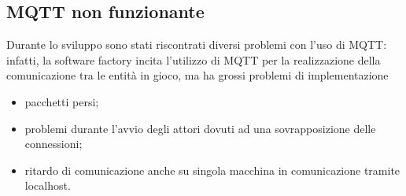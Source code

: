 \subsection{MQTT non funzionante}
Durante lo sviluppo sono stati riscontrati diversi problemi con l'uso di MQTT\@:
infatti, la software factory incita l'utilizzo di MQTT per la realizzazione della comunicazione tra le entità in gioco, ma ha grossi problemi di implementazione
\begin{itemize}
    \item pacchetti persi;
    \item problemi durante l'avvio degli attori dovuti ad una sovrapposizione delle connessioni;
    \item ritardo di comunicazione anche su singola macchina in comunicazione tramite localhost.
\end{itemize}
